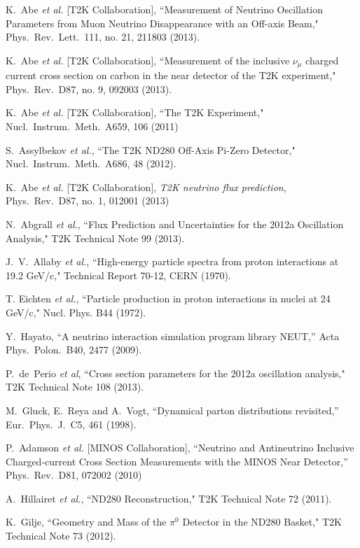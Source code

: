 \begin{thebibliography}{30}
 K.~Abe {\it et al.}  [T2K Collaboration],
  ``Measurement of Neutrino Oscillation Parameters from Muon Neutrino Disappearance with an Off-axis Beam,"
  Phys.\ Rev.\ Lett.\  111, no. 21, 211803 (2013).

 K.~Abe {\it et al.}  [T2K Collaboration],
 ``Measurement of the inclusive $\nu_\mu$ charged current cross section on carbon in the near detector of the T2K experiment,"
  Phys.\ Rev.\ D87, no. 9, 092003 (2013).

 K.~Abe {\it et al.}  [T2K Collaboration],
 ``The T2K Experiment,"
  Nucl.\ Instrum.\ Meth.\ A659, 106 (2011)

 S.~Assylbekov {\it et al.},
``The T2K ND280 Off-Axis Pi-Zero Detector,"
 Nucl.\ Instrum.\  Meth.\ A686, 48 (2012).

 K.~Abe {\it et al.}  [T2K Collaboration],
  \emph{T2K neutrino flux prediction},
  Phys.\ Rev.\ D87, no. 1, 012001 (2013)

 N.~Abgrall {\it et al.}, 
``Flux Prediction and Uncertainties for the 2012a Oscillation Analysis,"
T2K Technical Note 99 (2013).

 J.~V.~Allaby {\it et al.},
``High-energy particle spectra from proton interactions at 19.2 GeV/c,"
Technical Report 70-12, CERN (1970).

 T. Eichten {\it et al.},
``Particle production in proton interactions in nuclei at 24 GeV/c,"
Nucl. Phys. B44 (1972).

  Y.~Hayato,
  ``A neutrino interaction simulation program library NEUT,''
  Acta Phys.\ Polon.\ B40, 2477 (2009).

  P.~de~Perio {\it et al},
``Cross section parameters for the 2012a oscillation analysis,"
T2K Technical Note 108 (2013).

  M.~Gluck, E.~Reya and A.~Vogt,
  ``Dynamical parton distributions revisited,''
  Eur.\ Phys.\ J.\ C5, 461 (1998).

  P.~Adamson {\it et al.}  [MINOS Collaboration],
  ``Neutrino and Antineutrino Inclusive Charged-current Cross Section Measurements with the MINOS Near Detector,''
  Phys.\ Rev.\ D81, 072002 (2010)
  
 A.~Hillairet {\it et al.},
``ND280 Reconstruction,"
T2K Technical Note 72 (2011).

 K.~Gilje,
``Geometry and Mass of the $\pi^0$ Detector in the ND280 Basket,"
T2K Technical Note 73 (2012).


\end{thebibliography}
